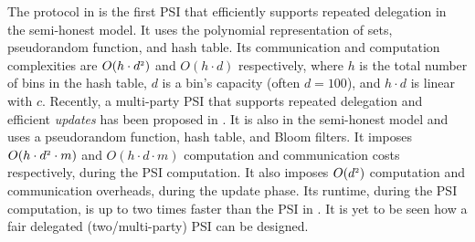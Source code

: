 The protocol in \cite{eopsi} is the first PSI that efficiently supports repeated delegation in the semi-honest model. It uses the polynomial representation of sets, pseudorandom function, and hash table. Its communication and computation complexities are $O(h\cdot d^{\scriptscriptstyle 2})$ and $O(h\cdot d)$ respectively, where $h$ is the total number of bins in the hash table, $d$ is a bin's capacity (often $d=100$), and $h\cdot d$ is linear with $c$.  
%
Recently, a multi-party PSI that supports repeated delegation and efficient \emph{updates} has been proposed in \cite{AbadiDMT22}. It is also in the semi-honest model and uses a pseudorandom function, hash table, and Bloom filters. It imposes $O(h\cdot d^{\scriptscriptstyle 2}\cdot m)$ and $O(h\cdot d\cdot m)$  computation and communication costs respectively, during the PSI computation. It also imposes $O(d^{\scriptscriptstyle 2})$  computation and communication overheads, during the update phase.  Its runtime, during the PSI computation, is up to two times faster than the  PSI in \cite{eopsi}. It is yet to be seen how a fair delegated (two/multi-party) PSI can be designed.










 
 
 